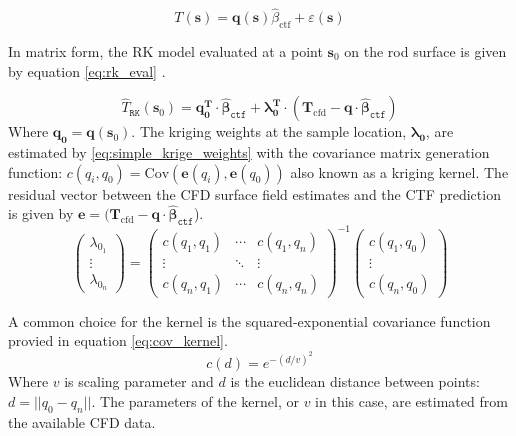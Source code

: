 \begin{equation}
    T(\mathbf s) = \mathbf q(\mathbf s) \hat \beta_{\mathrm{ctf}} + \varepsilon(\mathbf s)
\label{eq:decomp_2}
\end{equation}

In matrix form, the RK model evaluated at a point $\mathbf{s}_0 $ on the rod surface is given by equation \ref{eq:rk_eval} \cite{Hengl07}.

\begin{equation}
    \hat T_\mathtt{RK}(\mathbf{s}_0 ) = \mathbf{q}_\mathbf{0}^\mathbf{T} \cdot \mathbf{\hat \beta}_\mathtt{ctf} + \mathbf{\lambda }_\mathbf{0}^\mathbf{T} \cdot (\mathbf T_{\mathrm{cfd}}
- \mathbf{q} \cdot \mathbf{\hat \beta }_\mathtt{ctf} )
\label{eq:rk_eval}
\end{equation}
Where $\mathbf{q}_\mathbf{0}= \mathbf{q}(\mathbf s_0)$. The kriging weights at the sample location, $\mathbf{\lambda_0}$, are estimated by \ref{eq:simple_krige_weights} with the covariance matrix generation function: $c(q_i, q_0)= \mathrm{Cov}(\mathbf e(q_i), \mathbf e(q_0))$ also known as a kriging kernel.  The residual vector between the CFD surface field estimates and the CTF prediction is given by $\mathbf e = (\mathbf T_{\mathrm{cfd}} - \mathbf{q} \cdot \mathbf{\hat \beta }_\mathtt{ctf}$). 
\begin{equation}
\begin{pmatrix}\lambda_{0_1} \\ \vdots \\ \lambda_{0_n} \end{pmatrix}=
\begin{pmatrix}c(q_1,q_1) & \cdots & c(q_1,q_n) \\
\vdots & \ddots & \vdots  \\
c(q_n,q_1) & \cdots & c(q_n,q_n) 
\end{pmatrix}^{-1}
\begin{pmatrix}c(q_1,q_0) \\ \vdots \\ c(q_n,q_0) \end{pmatrix}
\label{eq:simple_krige_weights}
\end{equation}

A common choice for the kernel is the squared-exponential covariance function provied in equation \ref{eq:cov_kernel}.
\begin{equation}
    c(d) = e^{-(d/v)^2}
    \label{eq:cov_kernel}
\end{equation}
Where $v$ is scaling parameter and $d$ is the euclidean distance between points: $d=||q_0 - q_n||$.
The parameters of the kernel, or $v$ in this case, are estimated from the available CFD data.


